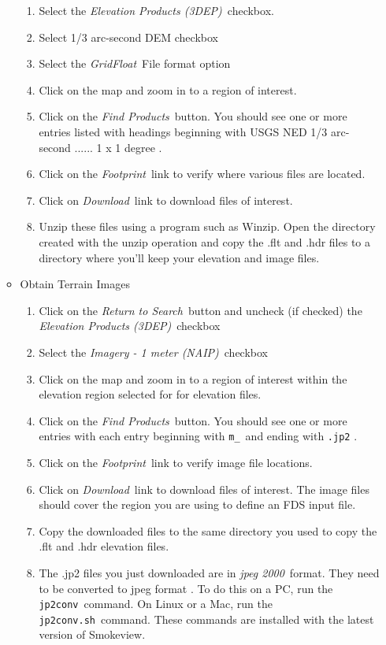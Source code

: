 \begin{itemize}
\begin{itemize}
\begin{enumerate}
\item Select the {\em Elevation Products (3DEP)}\ checkbox.
\item Select 1/3 arc-second DEM checkbox
\item Select the {\em GridFloat}\ File format option
\item Click on the map and zoom in to a region of interest.
\item Click on the {\em Find Products}\ button.  You should see one or more
entries listed with headings beginning with
USGS NED 1/3 arc-second ...... 1 x 1 degree .
\item Click on the {\em Footprint}\ link to verify where various files are located.
\item Click on {\em Download}\ link to download files of interest.
\item Unzip these files using a program such as Winzip. Open the directory created with the unzip operation and
copy the .flt and .hdr files to a directory where you'll keep your elevation and image files.
\end{enumerate}

\item Obtain Terrain Images
\begin{enumerate}
\item Click on the {\em Return to Search}\ button
and uncheck (if checked) the {\em Elevation Products (3DEP)}\ checkbox
\item Select the {\em Imagery - 1 meter (NAIP)}\ checkbox
\item Click on the map and zoom in to
a region of interest within the elevation region selected for for elevation files.
\item Click on the {\em Find Products}\ button.  You should see one or more
entries with each entry beginning with {\tt m\_}\ and ending with {\tt .jp2} .
\item Click on the {\em Footprint}\ link to verify image file locations.
\item Click on {\em Download}\ link to download files of interest. The image files should
cover the region you are using to define an FDS input file.
\item Copy the downloaded files to the same directory you used to copy the .flt and .hdr elevation files.
\item The .jp2 files you just downloaded are in {\em jpeg 2000}\ format.
They need to be converted to jpeg format .
To do this on a PC, run the {\tt jp2conv}\ command.
On Linux or a Mac, run the {\tt jp2conv.sh}\ command.
These commands are installed with the latest version of Smokeview.
\end{enumerate}
\end{itemize}
\end{itemize}

